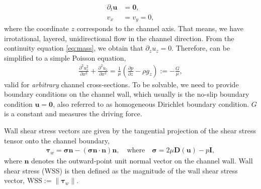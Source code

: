 \documentclass{article}
\begin{document}
\begin{align}
\partial_t \boldsymbol{u} &= \boldsymbol{0}, \\
v_x &= v_y = 0,
\end{align}
where the coordinate $z$ corresponds to the channel axis. That means, we have irrotational, layered, unidirectional flow in the channel direction. From the continuity equation \cref{eq:mass}, we obtain that $\partial_z u_z = 0$. Therefore,  can be simplified to
a simple Poisson equation,
\begin{align}
    \frac{\partial^2 u_z^2}{\partial x^2} + \frac{\partial^2 u_z}{\partial x^2} = \frac{1}{\mu}\left(\frac{\partial p}{\partial z} - \rho g_z\right) := -\frac{G}{\mu},
\label{eq:poisson}
\end{align}
valid for \emph{arbitrary} channel cross-sections. To be solvable, we need to provide boundary conditions on the channel wall, which usually is the no-slip boundary condition $\boldsymbol{u} = \boldsymbol{0}$, also referred to as homogeneous Dirichlet boundary condition. $G$ is a constant and measures the driving force.

Wall shear stress vectors are given by the tangential projection of the shear stress tensor onto the channel boundary,
\begin{align}
    \boldsymbol{\tau}_w = \boldsymbol{\sigma}\boldsymbol{n} - (\boldsymbol{\sigma}\boldsymbol{n} \cdot \boldsymbol{n})\boldsymbol{n}, \quad\text{where}\quad \boldsymbol{\sigma} = 2\mu \boldsymbol{D}(\boldsymbol{u}) - p\boldsymbol{I},
\label{eq:wss}
\end{align}
where $\boldsymbol{n}$ denotes the outward-point unit normal vector on the channel wall.
Wall shear stress (WSS) is then defined as the magnitude of the wall shear stress vector, $\text{WSS} := \rVert \boldsymbol{\tau}_w \lVert$.
\end{document}
